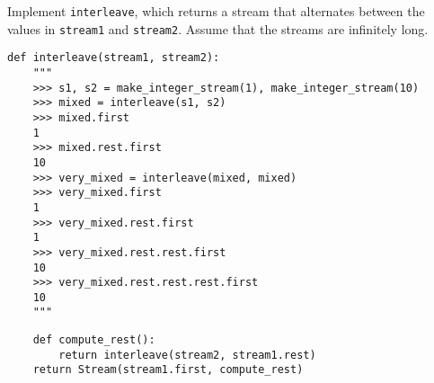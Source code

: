 \begin{blocksection}
\question Implement \lstinline$interleave$, which returns a stream that alternates between
the values in \lstinline$stream1$ and \lstinline$stream2$. Assume that the streams are
infinitely long.

\begin{lstlisting}
def interleave(stream1, stream2):
    """
    >>> s1, s2 = make_integer_stream(1), make_integer_stream(10)
    >>> mixed = interleave(s1, s2)
    >>> mixed.first
    1
    >>> mixed.rest.first
    10
    >>> very_mixed = interleave(mixed, mixed)
    >>> very_mixed.first
    1
    >>> very_mixed.rest.first
    1
    >>> very_mixed.rest.rest.first
    10
    >>> very_mixed.rest.rest.rest.first
    10
    """
\end{lstlisting}

\begin{solution}[1in]
\begin{lstlisting}
    def compute_rest():
        return interleave(stream2, stream1.rest)
    return Stream(stream1.first, compute_rest)
\end{lstlisting}
\end{solution}
\end{blocksection}
